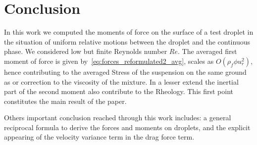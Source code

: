 \section{Conclusion}


In this work we computed the moments of force on the surface of a test droplet in the situation of uniform relative motions between the droplet and the continuous phase. 
We considered low but finite Reynolds number $Re$. 
The averaged first moment of force is given by~\ref{eq:forces_reformulated2_avg}, scales as $O(\rho_f \phi u_r^2)$, hence contributing to the averaged Stress of the suspension on the same ground as  \citet{einstein1905neue} or \citep{taylor1932viscosity} correction to the viscosity of the mixture. 
In a lesser extend the inertial part of the second moment also contribute to the Rheology. 
This first point constitutes the main result of the paper. 

Others important conclusion reached through this work includes: a general reciprocal formula to derive the forces and moments on droplets, and the explicit appearing of the velocity variance term in the drag force term. 





